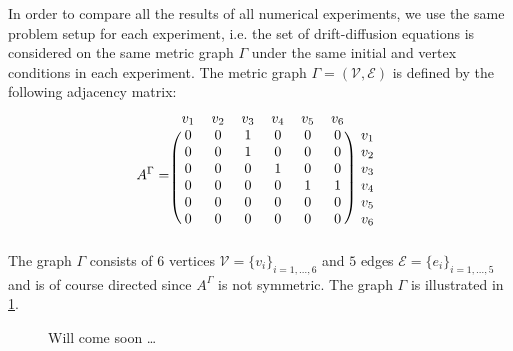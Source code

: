 In order to compare all the results of all numerical experiments, we use the same problem setup for each experiment, i.e. the set of drift-diffusion equations is considered on the same metric graph $\Gamma$ under the same initial and vertex conditions in each experiment. The metric graph $\Gamma = (\mathcal{V}, \mathcal{E})$ is defined by the following adjacency matrix: 
\begin{equation}
    \label{NumericalExperimentGraph}
    A^{\Gamma} = 
    \begin{blockarray}{ccccccc}
        v_1 & v_2 & v_3 & v_4 & v_5 & v_6 \\
        \begin{block}{(cccccc)c}
            0 & 0 & 1 & 0 & 0 & 0 & v_1 \\
            0 & 0 & 1 & 0 & 0 & 0 & v_2 \\
            0 & 0 & 0 & 1 & 0 & 0 & v_3 \\
            0 & 0 & 0 & 0 & 1 & 1 & v_4 \\
            0 & 0 & 0 & 0 & 0 & 0 & v_5 \\
            0 & 0 & 0 & 0 & 0 & 0 & v_6 \\
        \end{block}
    \end{blockarray}
\end{equation}
The graph $\Gamma$ consists of $6$ vertices $\mathcal{V} = \{ v_i \}_{i = 1,\ldots, 6}$ and $5$ edges $\mathcal{E} = \{ e_i \}_{i = 1,\ldots, 5}$ and is of course directed since $A^{\Gamma}$ is not symmetric. The graph $\Gamma$ is illustrated in \cref{fig7}. 
\begin{figure}[H]
    \begin{center}
    \end{center}
    \caption{Will come soon \ldots}
    \label{fig7}
\end{figure}
